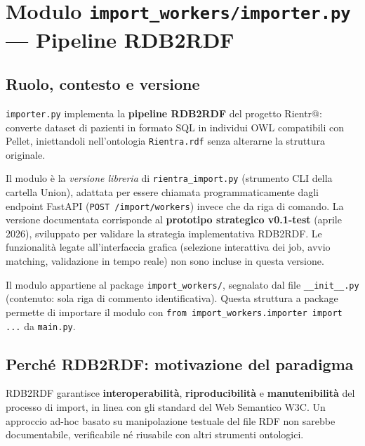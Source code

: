 \documentclass[a4paper,12pt]{article}
\begin{document}
\section{Modulo \texttt{import\_workers/importer.py} --- Pipeline RDB2RDF}

\subsection{Ruolo, contesto e versione}

\texttt{importer.py} implementa la \textbf{pipeline RDB2RDF} del progetto
Rientr@: converte dataset di pazienti in formato SQL in individui OWL
compatibili con Pellet, iniettandoli nell'ontologia \texttt{Rientra.rdf}
senza alterarne la struttura originale.

Il modulo \`{e} la \textit{versione libreria} di \texttt{rientra\_import.py}
(strumento CLI della cartella Union), adattata per essere chiamata
programmaticamente dagli endpoint FastAPI (\texttt{POST /import/workers})
invece che da riga di comando. La versione documentata corrisponde al
\textbf{prototipo strategico v0.1-test} (aprile 2026), sviluppato per
validare la strategia implementativa RDB2RDF. Le funzionalit\`{a} legate
all'interfaccia grafica (selezione interattiva dei job, avvio matching,
validazione in tempo reale) non sono incluse in questa versione.

Il modulo appartiene al package \texttt{import\_workers/}, segnalato dal
file \texttt{\_\_init\_\_.py} (contenuto: sola riga di commento identificativa).
Questa struttura a package permette di importare il modulo con
\texttt{from import\_\allowbreak{}workers.importer import ...} da \texttt{main.py}.

\subsection{Perch\'{e} RDB2RDF: motivazione del paradigma}

\begin{infobox}
RDB2RDF garantisce \textbf{interoperabilit\`{a}}, \textbf{riproducibilit\`{a}}
e \textbf{manutenibilit\`{a}} del processo di import, in linea con gli
standard del Web Semantico W3C. Un approccio ad-hoc basato su
manipolazione testuale del file RDF non sarebbe documentabile,
verificabile n\'{e} riusabile con altri strumenti ontologici.
\end{infobox}
\end{document}
